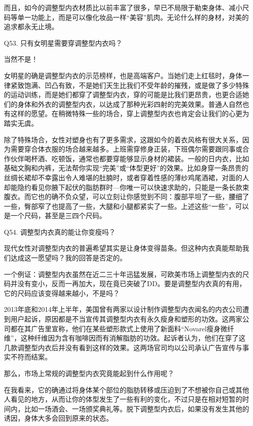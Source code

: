 \documentclass[12pt,UTF8]{ctexbook}
\begin{document}
而且，如今的调整型内衣材质比以前丰富了很多，早已不局限于勒束身体、减小尺码等单一功能上，而是可以像化妆品一样“美容”肌肉。无论什么样的身材，对美的追求都永无止境。





Q53. 只有女明星需要穿调整型内衣吗？


当然不是！

女明星的确是调整型内衣的示范榜样，也是高端客户。当她们走上红毯时，身体一律紧致饱满、凹凸有致，不是她们天生比我们不受年龄的摧残，或是做了多少特殊的运动训练，而是她们都穿了调整型内衣，穿的可能是比我们更昂贵，也更合适她们的身体和外衣的调整型内衣，以达成了那种光彩四射的完美效果。普通人自然也有这样的愿望。在稍微特殊一些的场合，穿上调整型内衣也肯定会让我们的心更为踏实无虞。

除了特殊场合，女性对塑身也有了更多需求，这跟如今的着衣风格有很大关系，因为需要穿合体衣服的场合越来越多。上班需穿修身正装，下班偶尔需要跟同事或合作伙伴喝杯酒、吃顿饭，通常也都要穿能够显示身材的裙装。一般的日内衣，比如基础文胸和内裤，无法帮你实现“完美”或“体型更好”的效果。比如身穿一条昂贵的丝绸长裙却不幸露出令人难堪的肚腩时，或者穿着性感的薄纱鸡尾酒裙，对面的人却能隐约看见你腋下起伏的脂肪群时—你唯一可以快速求助的，只能是一条长款束腹衣。而它也的确不负众望，可以立刻让你感觉到不同：腹部平坦了一些，腰细了一些，臀部窄了也提高了一些，大腿和小腿都紧实了一些。上述这些“一些”，可以是一个尺码，甚至是三四个尺码。





Q54. 调整型内衣真的能让你变瘦吗？


现代女性对调整型内衣的普遍希望其实是让身体变得苗条。但这种内衣真能帮助我们达成这一愿望吗？我的回答是否定的。

一个例证：调整型内衣虽然在近二三十年迅猛发展，可欧美市场上调整型内衣的尺码并没有变小，反而一再加大，现在竟已突破了DD。要是调整型内衣真的有用，它的尺码应该变得越来越小，不是吗？

2013年底和2014年上半年，美国曾有两家以设计制作调整型内衣闻名的内衣公司遭到用户起诉，原因都是不当宣传其调整型内衣有永久瘦身和塑形的功效。这两家公司都在其广告里宣称，他们在某些塑形款式上使用了新面料“Novarel瘦身微纤维”，这种纤维因为含有咖啡因而有消解脂肪的功效。起诉者认为，他们在穿了这几款调整型内衣后并没有看到这样的效果。这两场官司均以公司承认广告宣传与事实不符而结案。

那么，市场上常规的调整型内衣究竟能起到什么作用呢？

在我看来，它的确通过将身体某个部位的脂肪转移或压迫到了不想被你自己或其他人看见的地方，从而让你的体型发生了一些有利的变化，不过只是在相对短暂的时间内，比如一场酒会、一场颁奖典礼等。脱下调整型内衣后，如果没有发生其他的诱因，身体大多会回到原来的状态。
\end{document}
